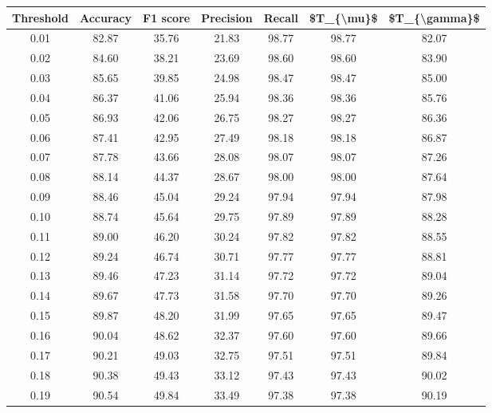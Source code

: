 \begin{tabular}{|c|c|c|c|c|c|c|}
\hline
 Threshold &  Accuracy &  F1 score &  Precision &  Recall &  \$T\_\{\textbackslash mu\}\$ &  \$T\_\{\textbackslash gamma\}\$ \\
\hline
      0.01 &     82.87 &     35.76 &      21.83 &   98.77 &      98.77 &         82.07 \\
      0.02 &     84.60 &     38.21 &      23.69 &   98.60 &      98.60 &         83.90 \\
      0.03 &     85.65 &     39.85 &      24.98 &   98.47 &      98.47 &         85.00 \\
      0.04 &     86.37 &     41.06 &      25.94 &   98.36 &      98.36 &         85.76 \\
      0.05 &     86.93 &     42.06 &      26.75 &   98.27 &      98.27 &         86.36 \\
      0.06 &     87.41 &     42.95 &      27.49 &   98.18 &      98.18 &         86.87 \\
      0.07 &     87.78 &     43.66 &      28.08 &   98.07 &      98.07 &         87.26 \\
      0.08 &     88.14 &     44.37 &      28.67 &   98.00 &      98.00 &         87.64 \\
      0.09 &     88.46 &     45.04 &      29.24 &   97.94 &      97.94 &         87.98 \\
      0.10 &     88.74 &     45.64 &      29.75 &   97.89 &      97.89 &         88.28 \\
      0.11 &     89.00 &     46.20 &      30.24 &   97.82 &      97.82 &         88.55 \\
      0.12 &     89.24 &     46.74 &      30.71 &   97.77 &      97.77 &         88.81 \\
      0.13 &     89.46 &     47.23 &      31.14 &   97.72 &      97.72 &         89.04 \\
      0.14 &     89.67 &     47.73 &      31.58 &   97.70 &      97.70 &         89.26 \\
      0.15 &     89.87 &     48.20 &      31.99 &   97.65 &      97.65 &         89.47 \\
      0.16 &     90.04 &     48.62 &      32.37 &   97.60 &      97.60 &         89.66 \\
      0.17 &     90.21 &     49.03 &      32.75 &   97.51 &      97.51 &         89.84 \\
      0.18 &     90.38 &     49.43 &      33.12 &   97.43 &      97.43 &         90.02 \\
      0.19 &     90.54 &     49.84 &      33.49 &   97.38 &      97.38 &         90.19 \\

\end{tabular}
